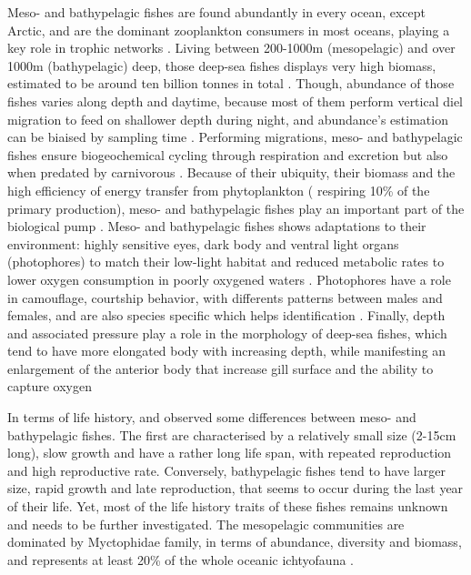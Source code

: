 Meso- and bathypelagic fishes are found abundantly in every ocean, except Arctic, and are the dominant zooplankton consumers in most oceans, playing a key role in trophic networks \citep{davison2015,salvanes2009}. Living between 200-1000m (mesopelagic) and over 1000m (bathypelagic) deep, those deep-sea fishes displays very high biomass, estimated to be around ten billion tonnes in total \citep{garcia2021,gjoesaeter1980,richards2019}. Though, abundance of those fishes varies along depth and daytime, because most of them perform vertical diel migration to feed on shallower depth during night, and abundance's estimation can be biaised by sampling time \citep{catul2011,gaskett2001,garcia2021,pusch2004,salvanes2009}. Performing migrations, meso- and bathypelagic fishes ensure biogeochemical cycling through respiration and excretion but also when predated by carnivorous \citep{garcia2021,spitz2019}. Because of their ubiquity, their biomass and the high efficiency of energy transfer from phytoplankton ( respiring 10\% of the primary production),  meso- and bathypelagic fishes play an important part of the biological pump \citep{garcia2021,spitz2019}.
Meso- and bathypelagic fishes shows adaptations to their environment: highly sensitive eyes, dark body and ventral light organs (photophores) to match their low-light habitat and reduced metabolic rates to lower oxygen consumption in poorly oxygened waters \citep{salvanes2009,farre2016}. Photophores have a role in camouflage, courtship behavior, with differents patterns between males and females, and are also species specific which helps identification \citep{paitio2020,salvanes2009}. Finally, depth and associated pressure play a role in the morphology of deep-sea fishes, which tend to have more elongated body with increasing depth, while manifesting an enlargement of the anterior body that increase gill surface and the ability to capture oxygen \citep{farre2016}

In terms of life history, \citet{childress1980} and \citet{salvanes2009} observed some differences between meso- and bathypelagic fishes. The first are characterised by a relatively small size (2-15cm long), slow growth and have a rather long life span, with repeated reproduction and high reproductive rate. Conversely, bathypelagic fishes tend to have larger size, rapid growth and late reproduction, that seems to occur during the last year of their life. Yet, most of the life history traits of these fishes remains unknown and needs to be further investigated. The mesopelagic communities are dominated by Myctophidae family, in terms of abundance, diversity and biomass, and represents at least 20\% of the whole oceanic ichtyofauna \citep{catul2011,kozlov1995,pusch2004}.

